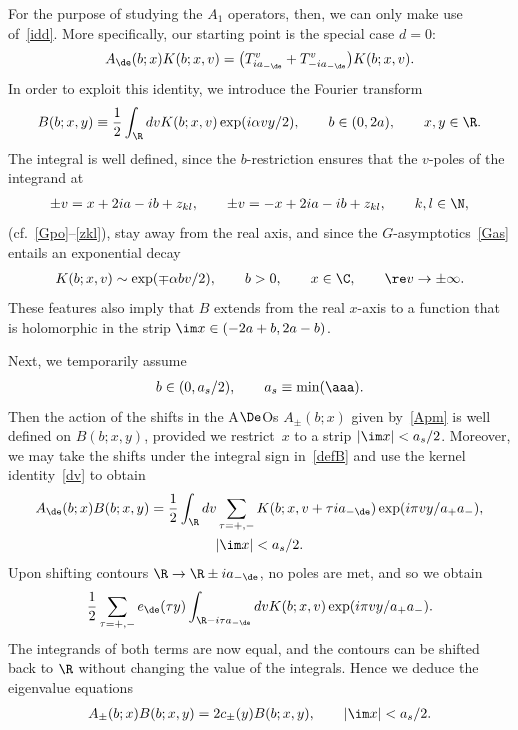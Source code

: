 For the purpose of studying the $A_1$ operators, then, we can only make use of~\eqref{idd}. More specif\/ically, our starting point is the special case $d=0$:
\begin{gather}\label{dv}
A_{\de}(b;x)K(b;x,v)= \big(T^v_{ia_{-\de}} +T^v_{-ia_{-\de}} \big)K(b;x,v).
\end{gather}
In order to exploit this identity, we introduce  the Fourier transform
\begin{gather}\label{defB}
B(b;x,y)\equiv \frac{1}{2}\int_{\R}dvK(b;x,v)\exp(i\alpha vy/2),\qquad b\in(0,2a),\qquad x,y\in \R.
\end{gather}
The integral is well def\/ined, since the $b$-restriction ensures that the $v$-poles of the integrand at
\begin{gather}\label{Kpo}
\pm v=x+2ia-ib+z_{kl}, \qquad \pm v=-x+2ia-ib+z_{kl},\qquad k,l\in\N,
\end{gather}
(cf.~\eqref{Gpo}--\eqref{zkl}), stay away from the real axis, and since the $G$-asymptotics~\eqref{Gas} entails an exponential decay
\begin{gather}
K(b;x,v)\sim \exp(\mp \alpha bv/2),\qquad b>0,\qquad x\in\C,\qquad \re v\to\pm\infty.
\end{gather}
These features also imply that $B$ extends from the real $x$-axis to a function that is holomorphic in the strip $\im x\in (-2a+b,2a-b)$.

Next, we temporarily  assume
\begin{gather}
b\in(0,a_s/2),\qquad a_s\equiv\min(\aaa).
\end{gather}
Then the action of the shifts in the A$\De$Os $A_{\pm}(b;x)$ given by~\eqref{Apm} is well def\/ined on $B(b;x,y)$, provided we restrict~$x$ to a strip $|\im x|<a_s/2$. Moreover, we may take the shifts under the integral sign in~\eqref{defB} and use the kernel identity~\eqref{dv} to obtain
\begin{gather}
A_{\de}(b;x)B(b;x,y)=\frac{1}{2}\int_{\R}dv\sum_{\tau=+,-}K(b;x,v+\tau ia_{-\de})\exp(i\pi vy/a_+a_-),\\
 |\im x|<a_s/2.\nonumber
\end{gather}
Upon shifting contours $\R\to \R\pm ia_{-\de}$, no poles are met, and so we obtain
\begin{gather}
\frac12\sum_{\tau=+,-}e_{\de}(\tau y)\int_{\R-i\tau a_{-\de}}dvK(b;x,v)\exp(i\pi vy/a_+a_-).
\end{gather}
The integrands of both terms are now equal, and the contours can be shifted back to $\R$ without changing the value of the integrals. Hence we deduce the eigenvalue equations
\begin{gather}\label{eigen}
A_{\pm}(b;x)B(b;x,y)=2c_{\pm}(y)B(b;x,y),\qquad |\im x|<a_s/2.
\end{gather}

